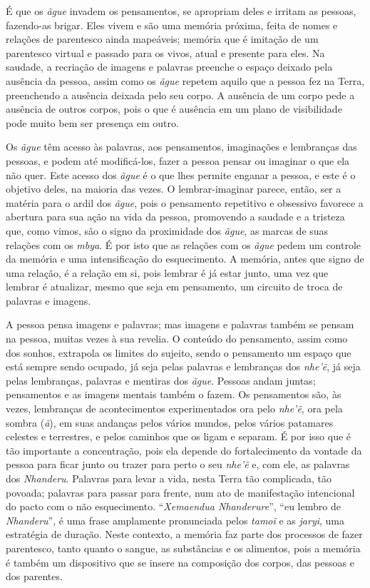 É que os \emph{ãgue} invadem os pensamentos, se apropriam deles e irritam as
pessoas, fazendo-as brigar. Eles vivem e são uma memória próxima, feita
de nomes e relações de parentesco ainda mapeáveis; memória que é
imitação de um parentesco virtual e passado para os vivos, atual e
presente para eles. Na saudade, a recriação de imagens e palavras
preenche o espaço deixado pela ausência da pessoa, assim como os \emph{ãgue}
repetem aquilo que a pessoa fez na Terra, preenchendo a ausência
deixada pelo seu corpo. A ausência de um corpo pede a ausência de
outros corpos, pois o que é ausência em um plano de visibilidade pode
muito bem ser presença em outro. 

Os \emph{ãgue} têm acesso às palavras, aos pensamentos, imaginações e
lembranças das pessoas, e podem até modificá-los, fazer a pessoa pensar
ou imaginar o que ela não quer. Este acesso dos \emph{ãgue} é o que lhes
permite enganar a pessoa, e este é o objetivo deles, na maioria das
vezes. O lembrar-imaginar parece, então, ser a matéria para o ardil dos
\emph{ãgue}, pois o pensamento repetitivo e obsessivo favorece a abertura para
sua ação na vida da pessoa, promovendo a saudade e a tristeza que, como
vimos, são o signo da proximidade dos \emph{ãgue}, as marcas de suas relações
com os \emph{mbya}. É por isto que as relações com os \emph{ãgue} pedem um controle
da memória e uma intensificação do esquecimento. A memória, antes que
signo de uma relação, é a relação em si, pois lembrar é já estar junto,
uma vez que lembrar é atualizar, mesmo que seja em pensamento, um
circuito de troca de palavras e imagens.

A pessoa pensa imagens e palavras; mas imagens e palavras também se
pensam na pessoa, muitas vezes à sua revelia. O conteúdo do pensamento,
assim como dos sonhos, extrapola os limites do sujeito, sendo o
pensamento um espaço que está sempre sendo ocupado, já seja pelas
palavras e lembranças dos \emph{nhe’ẽ}, já seja pelas lembranças,
palavras e mentiras dos \emph{ãgue}. Pessoas andam juntas; pensamentos e as
imagens mentais também o fazem. Os pensamentos são, às vezes, lembranças
de acontecimentos experimentados ora pelo \emph{nhe’ẽ}, ora pela sombra
(\emph{ã}), em suas andanças pelos vários mundos, pelos vários patamares
celestes e terrestres, e pelos caminhos que os ligam e separam. É por
isso que é tão importante a concentração, pois ela depende do
fortalecimento da vontade da pessoa para ficar junto ou trazer para
perto o seu \emph{nhe’ẽ} e, com ele, as palavras dos \emph{Nhanderu}. Palavras
para levar a vida, nesta Terra tão complicada, tão povoada; palavras
para passar para frente, num ato de manifestação intencional do pacto
com o não esquecimento. ``\emph{Xemaendua Nhanderure}'', ``eu lembro de
\emph{Nhanderu}'', é uma frase amplamente pronunciada pelos \emph{tamoĩ} e as
\emph{jaryi}, uma estratégia de duração. Neste contexto, a memória faz parte
dos processos de fazer parentesco, tanto quanto o sangue, as
substâncias e os alimentos, pois a memória é também um dispositivo que
se insere na composição dos corpos, das pessoas e dos parentes.

